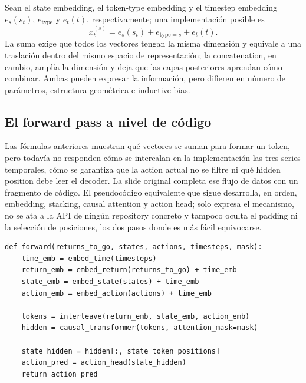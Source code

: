Sean el state embedding, el token-type embedding y el timestep embedding $e_s(s_t)$, $e_{\mathrm{type}}$ y $e_t(t)$, respectivamente; una implementación posible es
\[
x_t^{(s)}=e_s(s_t)+e_{\mathrm{type}=s}+e_t(t).
\]
La suma exige que todos los vectores tengan la misma dimensión y equivale a una traslación dentro del mismo espacio de representación; la concatenation, en cambio, amplía la dimensión y deja que las capas posteriores aprendan cómo combinar. Ambas pueden expresar la información, pero difieren en número de parámetros, estructura geométrica e inductive bias.


\subsection{El forward pass a nivel de código}

Las fórmulas anteriores muestran qué vectores se suman para formar un token, pero todavía no responden cómo se intercalan en la implementación las tres series temporales, cómo se garantiza que la action actual no se filtre ni qué hidden position debe leer el decoder. La slide original completa ese flujo de datos con un fragmento de código. El pseudocódigo equivalente que sigue desarrolla, en orden, embedding, stacking, causal attention y action head; solo expresa el mecanismo, no se ata a la API de ningún repository concreto y tampoco oculta el padding ni la selección de posiciones, los dos pasos donde es más fácil equivocarse.


\begin{lstlisting}[caption={Pseudocódigo mínimo del forward pass de Decision Transformer},label={lst:dt-forward}]
def forward(returns_to_go, states, actions, timesteps, mask):
    time_emb = embed_time(timesteps)
    return_emb = embed_return(returns_to_go) + time_emb
    state_emb = embed_state(states) + time_emb
    action_emb = embed_action(actions) + time_emb

    tokens = interleave(return_emb, state_emb, action_emb)
    hidden = causal_transformer(tokens, attention_mask=mask)

    state_hidden = hidden[:, state_token_positions]
    action_pred = action_head(state_hidden)
    return action_pred
\end{lstlisting}

